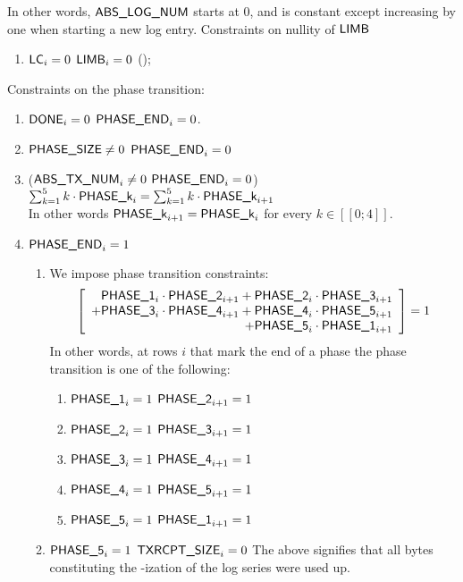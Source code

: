 In other words, $\textsf{ABS\_LOG\_NUM}$ starts at 0, and is constant except increasing by one when starting a new log entry.
Constraints on nullity of $\textsf{LIMB}$
\begin{enumerate}[resume]
    \item \If $\textsf{LC}_{i}=0$ \Then $\textsf{LIMB}_{i}=0$ (\trash);
\end{enumerate}
Constraints on the phase transition:
\begin{enumerate}[resume]
    \item \If $\textsf{DONE}_{i}=0$ \Then $\textsf{PHASE\_END}_{i}=0$.
    \item \If $\textsf{PHASE\_SIZE} \ne 0$ \Then $\textsf{PHASE\_END}_{i}=0$
    \item \If ($\textsf{ABS\_TX\_NUM}_{i} \ne 0$ \et $\textsf{PHASE\_END}_{i}=0$) \Then $\sum_{k=1}^{5} k \cdot \textsf{PHASE\_k}_{i} = \sum_{k=1}^{5} k \cdot \textsf{PHASE\_k}_{i+1}$                             \\
        In other words $\textsf{PHASE\_k}_{i+1}=\textsf{PHASE\_k}_{i}$ for every $k \in [\![ 0 ; 4 ]\!]$.
    \item \If $\textsf{PHASE\_END}_{i}=1$ \Then
        \begin{enumerate}
            \item We impose phase transition constraints:
                \[
                    \left[
                        \begin{array}{r}
                            \textsf{PHASE\_1}_{i} \cdot \textsf{PHASE\_2}_{i+1}
                            + \textsf{PHASE\_2}_{i} \cdot \textsf{PHASE\_3}_{i+1} \\
                            + \textsf{PHASE\_3}_{i} \cdot \textsf{PHASE\_4}_{i+1} 
                            + \textsf{PHASE\_4}_{i} \cdot \textsf{PHASE\_5}_{i+1} \\
                            + \textsf{PHASE\_5}_{i} \cdot \textsf{PHASE\_1}_{i+1} \\
                        \end{array}
                        \right]
                    = 1
                \]
                In other words, at rows $i$ that mark the end of a phase the phase transition is one of the following:
                \begin{enumerate}
                    \item \If $\textsf{PHASE\_1}_{i}=1$ \Then $\textsf{PHASE\_2}_{i+1}=1$
                    \item \If $\textsf{PHASE\_2}_{i}=1$ \Then $\textsf{PHASE\_3}_{i+1}=1$
                    \item \If $\textsf{PHASE\_3}_{i}=1$ \Then $\textsf{PHASE\_4}_{i+1}=1$
                    \item \If $\textsf{PHASE\_4}_{i}=1$ \Then $\textsf{PHASE\_5}_{i+1}=1$
                    \item \If $\textsf{PHASE\_5}_{i}=1$ \Then $\textsf{PHASE\_1}_{i+1}=1$
                \end{enumerate}
            \item \If $\textsf{PHASE\_5}_{i}=1$ \Then $\textsf{TXRCPT\_SIZE}_{i}=0$
                The above signifies that all bytes constituting the \rlp{}-ization of the log series were used up.
        \end{enumerate}
\end{enumerate}

